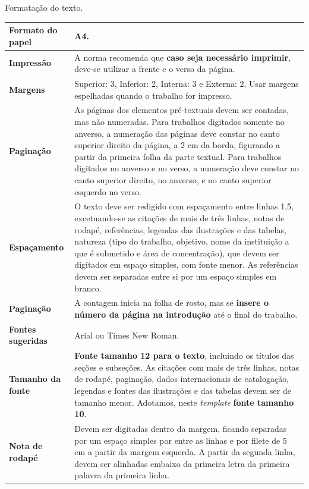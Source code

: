 \begin{quadro}[htb]
	\centering
	\caption{\label{qua:Quadro_1}Formatação do texto.}	
	\begin{tabular}{|l|p{11cm}|}
		\hline
		\textbf{Formato do papel} & A4.\\ \hline
		\textbf{Impressão}        & A norma recomenda que \textbf{caso seja necessário imprimir}, deve-se utilizar a frente e o verso da página.\\ \hline
		\textbf{Margens}          & Superior: 3, Inferior: 2, Interna: 3 e Externa: 2. Usar margens espelhadas quando o  trabalho for impresso.\\ \hline
		\textbf{Paginação}        & As páginas dos elementos pré-textuais devem ser contadas, mas não numeradas. Para trabalhos digitados somente no anverso, a numeração das páginas deve constar no canto superior direito da página, a 2 cm da borda, figurando a partir da primeira folha da  parte textual. Para trabalhos digitados no anverso e no verso, a numeração deve constar no canto superior direito, no anverso, e no canto superior esquerdo no verso.\\ \hline
		\textbf{Espaçamento}      & O texto deve ser redigido com espaçamento entre linhas 1,5, excetuando-se as citações de mais de três linhas, notas de rodapé, referências, legendas das ilustrações e das tabelas, natureza (tipo do trabalho, objetivo, nome da instituição a que é submetido e área de concentração), que devem ser digitados em espaço simples, com fonte menor. As referências devem ser separadas entre si por um espaço simples em branco.\\ \hline
		\textbf{Paginação}        & A contagem inicia na folha de rosto, mas se \textbf{insere o número da página na introdução} até o final do trabalho.\\ \hline
		\textbf{Fontes sugeridas} & Arial ou Times New Roman.\\ \hline
		\textbf{Tamanho da fonte} & \textbf{Fonte tamanho 12 para o texto}, incluindo os títulos das seções e subseções. As citações com mais de três linhas, notas de rodapé, paginação, dados internacionais de catalogação, legendas e fontes das ilustrações e das tabelas devem ser de tamanho menor. Adotamos, neste \textit{template} \textbf{fonte tamanho 10}.\\ \hline
		\textbf{Nota de rodapé}   & Devem ser digitadas dentro da margem, ficando separadas por um espaço simples por entre as linhas e por filete de 5 cm a partir da margem esquerda. A partir da segunda linha, devem ser alinhadas embaixo da primeira letra da primeira palavra da primeira linha.\\ \hline
	\end{tabular}
\end{quadro}


